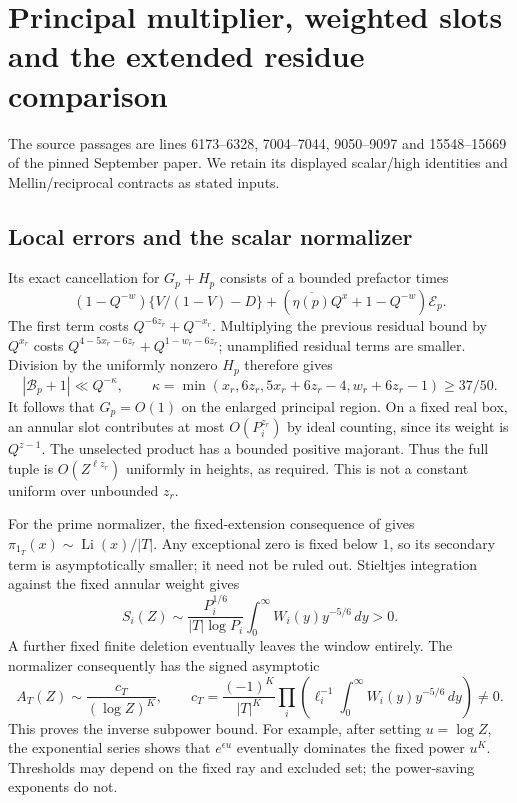 \section{Principal multiplier, weighted slots and the extended residue comparison}
The source passages are lines 6173--6328, 7004--7044, 9050--9097 and
15548--15669 of the pinned September paper. We retain its displayed
scalar/high identities and Mellin/reciprocal contracts as stated inputs.

\subsection{Local errors and the scalar normalizer}
Its exact cancellation for $G_p+H_p$ consists of a bounded prefactor times
\[
 (1-Q^{-w})\{V/(1-V)-D\}
 +(\overline{\eta(p)}Q^x+1-Q^{-w})\mathcal E_p.
\]
The first term costs $Q^{-6z_r}+Q^{-x_r}$. Multiplying the previous
residual bound by $Q^{x_r}$ costs
$Q^{4-5x_r-6z_r}+Q^{1-w_r-6z_r}$; unamplified residual terms are
smaller. Division by the uniformly nonzero $H_p$ therefore gives
\[
 |\mathcal B_p+1|\ll Q^{-\kappa},\qquad
 \kappa=\min(x_r,6z_r,5x_r+6z_r-4,w_r+6z_r-1)\ge37/50.
\]
It follows that $G_p=O(1)$ on the enlarged principal region. On a fixed
real box, an annular slot contributes at most $O(P_i^{z_r})$ by ideal
counting, since its weight is $Q^{z-1}$. The unselected product has a
bounded positive majorant. Thus the full tuple is $O(Z^{\ell z_r})$
uniformly in heights, as required. This is not a constant uniform over
unbounded $z_r$.

For the prime normalizer, the fixed-extension consequence of
\cite[Theorem 1.1]{tz} gives
$\pi_{1_T}(x)\sim\operatorname{Li}(x)/|T|$.
Any exceptional zero is fixed below $1$, so its secondary term is
asymptotically smaller; it need not be ruled out. Stieltjes integration
against the fixed annular weight gives
\[
 S_i(Z)\sim\frac{P_i^{1/6}}{|T|\log P_i}
                  \int_0^\infty W_i(y)y^{-5/6}\,dy>0.
\]
A further fixed finite deletion eventually leaves the window entirely.
The normalizer consequently has the signed asymptotic
\[
 A_T(Z)\sim\frac{c_T}{(\log Z)^K},\qquad
 c_T=\frac{(-1)^K}{|T|^K}\prod_i
       \left(\ell_i^{-1}\int_0^\infty W_i(y)y^{-5/6}\,dy\right)\ne0.
\]
This proves the inverse subpower bound. For example, after setting
$u=\log Z$, the exponential series shows that $e^{\epsilon u}$ eventually
dominates the fixed power $u^K$. Thresholds may depend on the fixed ray
and excluded set; the power-saving exponents do not.

